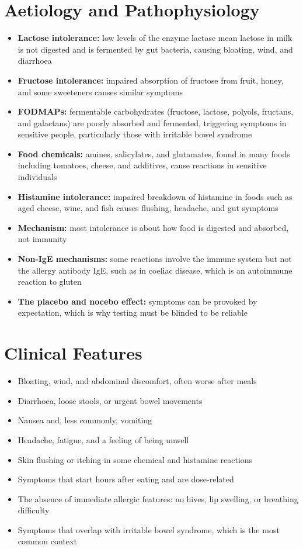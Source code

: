 \section*{Aetiology and Pathophysiology}
\begin{itemize}
    \item \textbf{Lactose intolerance:} low levels of the enzyme lactase mean lactose in milk is not digested and is fermented by gut bacteria, causing bloating, wind, and diarrhoea
    \item \textbf{Fructose intolerance:} impaired absorption of fructose from fruit, honey, and some sweeteners causes similar symptoms
    \item \textbf{FODMAPs:} fermentable carbohydrates (fructose, lactose, polyols, fructans, and galactans) are poorly absorbed and fermented, triggering symptoms in sensitive people, particularly those with irritable bowel syndrome
    \item \textbf{Food chemicals:} amines, salicylates, and glutamates, found in many foods including tomatoes, cheese, and additives, cause reactions in sensitive individuals
    \item \textbf{Histamine intolerance:} impaired breakdown of histamine in foods such as aged cheese, wine, and fish causes flushing, headache, and gut symptoms
    \item \textbf{Mechanism:} most intolerance is about how food is digested and absorbed, not immunity
    \item \textbf{Non-IgE mechanisms:} some reactions involve the immune system but not the allergy antibody IgE, such as in coeliac disease, which is an autoimmune reaction to gluten
    \item \textbf{The placebo and nocebo effect:} symptoms can be provoked by expectation, which is why testing must be blinded to be reliable
\end{itemize}

\section*{Clinical Features}
\begin{itemize}
    \item Bloating, wind, and abdominal discomfort, often worse after meals
    \item Diarrhoea, loose stools, or urgent bowel movements
    \item Nausea and, less commonly, vomiting
    \item Headache, fatigue, and a feeling of being unwell
    \item Skin flushing or itching in some chemical and histamine reactions
    \item Symptoms that start hours after eating and are dose-related
    \item The absence of immediate allergic features: no hives, lip swelling, or breathing difficulty
    \item Symptoms that overlap with irritable bowel syndrome, which is the most common context
\end{itemize}

